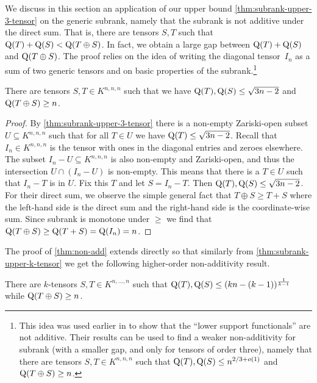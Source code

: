 \documentclass[11pt]{article}
\theoremstyle{definition}
\theoremstyle{remark}
\newcommand{\subrank}{{\rm Q}}
\begin{document}
We discuss in this section an application of our upper bound \autoref{thm:subrank-upper-3-tensor} on the generic subrank, namely that the subrank is not additive under the direct sum. That is, there are tensors $S,T$ such that $\subrank(T) + \subrank(S) < \subrank(T \oplus S)$. In fact, we obtain a large gap between $\subrank(T) + \subrank(S)$ and $\subrank(T \oplus S)$. The proof relies on the idea of writing the diagonal tensor~$I_n$ as a sum of two generic tensors and on basic properties of the subrank.\footnote{This idea was used earlier in \cite{burg} to show that the ``lower support functionals'' \cite{strassen1991degeneration} are not additive. Their results can be used to find a weaker non-additivity for subrank (with a smaller gap, and only for tensors of order three), namely that there are tensors $S,T \in K^{n,n,n}$ such that $\subrank(T), \subrank(S) \leq n^{2/3 + o(1)}$ and $\subrank(T \oplus S) \geq n$.}

\begin{theorem}\label{thm:non-add}
There are tensors $S,T \in K^{n,n,n}$ such that we have $\subrank(T), \subrank(S) \leq \sqrt{3n-2}$ and $\subrank(T \oplus S) \geq n$.
\end{theorem}

\begin{proof}
By \autoref{thm:subrank-upper-3-tensor} there is a non-empty Zariski-open subset $U \subseteq K^{n,n,n}$ such that for all $T \in U$ we have $\subrank(T) \leq \sqrt{3n-2}$. Recall that $I_n \in K^{n,n,n}$ is the tensor with ones in the diagonal entries and zeroes elsewhere. The subset $I_n - U \subseteq K^{n,n,n}$ is also non-empty and Zariski-open, and thus the intersection $U \cap (I_n - U)$ is non-empty. This means that there is a $T \in U$ such that $I_n - T$ is in $U$. Fix this $T$ and let $S = I_n - T$. Then $\subrank(T), \subrank(S) \leq \sqrt{3n-2}$. For their direct sum, we observe the simple general fact that $T \oplus S \geq T + S$ where the left-hand side is the direct sum and the right-hand side is the coordinate-wise sum. Since subrank is monotone under $\geq$ we find that $\subrank(T \oplus S) \geq \subrank(T + S) = \subrank(I_n) = n$.
\end{proof}

The proof of \autoref{thm:non-add} extends directly so that similarly from \autoref{thm:subrank-upper-k-tensor} we get the following higher-order non-additivity result.

\begin{theorem}
There are $k$-tensors $S,T \in K^{n,\ldots,n}$ such that $\subrank(T), \subrank(S) \leq (kn-(k-1))^{\frac{1}{k-1}}$
while $\subrank(T \oplus S) \geq n$.
\end{theorem}
\end{document}
